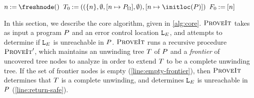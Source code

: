 \begin{algorithm}[ht]
  $\nodenm \assign \freshnode()$ \;
  $\treenm_0 \assign
  ((\singleton{\nodenm}, \emptyset,
  [\nodenm \mapsto \patuni], \emptyset),
  [ \nodenm \mapsto \initloc(\prognm) ])$ \label{line:tree-init} \;
  $F_0 \mathbin{:=} [ n ]$ \label{line:frontier-init} \;
  \label{line:base-call} \;
  \caption{$\verifier$: the core verification algorithm.
    $\verifier$ takes as input (1) a \lang program
    $\prognm$ and (2) an error control location $\errloc$, and
    determines if $\errloc$ is reachable in $\prognm$.}
\label{alg:core}
\end{algorithm}
In this section, we describe the core \verifier algorithm, given in
\autoref{alg:core}.
%
$\verifier$ takes as input a program $\prognm$ and an error
control location $\errloc$, and attempts to determine if $\errloc$ is
unreachable in $\prognm$.
$\verifier$ runs a recursive procedure $\textsc{ProveIt}'$, which maintains
an unwinding tree $T$ of $\prognm$ and a \emph{frontier} of
uncovered tree nodes to analyze in order to extend $T$ to be a
complete unwinding tree.
If the set of frontier nodes is empty (\autoref{line:empty-frontier}),
then $\verifier$ determines that $T$ is a complete
unwinding, and determines $\errloc$ is unreachable in $\prognm$
(\autoref{line:return-safe}).

